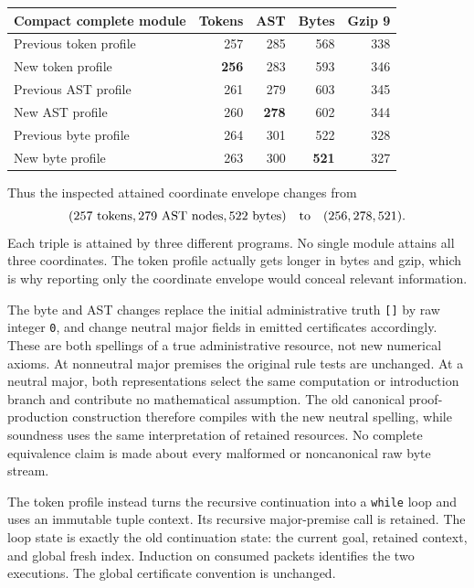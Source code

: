 \documentclass[11pt,a4paper]{article}
\theoremstyle{definition}
\begin{document}
\begin{center}
\small
\begin{tabular}{@{}lrrrr@{}}
\toprule
Compact complete module & Tokens & AST & Bytes & Gzip 9 \\
\midrule
Previous token profile & 257 & 285 & 568 & 338 \\
New token profile & \textbf{256} & 283 & 593 & 346 \\
Previous AST profile & 261 & 279 & 603 & 345 \\
New AST profile & 260 & \textbf{278} & 602 & 344 \\
Previous byte profile & 264 & 301 & 522 & 328 \\
New byte profile & 263 & 300 & \textbf{521} & 327 \\
\bottomrule
\end{tabular}
\end{center}

Thus the inspected attained coordinate envelope changes from
\[
 (257\text{ tokens},279\text{ AST nodes},522\text{ bytes})
 \quad\hbox{to}\quad
 (256,278,521).
\]
Each triple is attained by three different programs. No single module
attains all three coordinates. The token profile actually gets longer
in bytes and gzip, which is why reporting only the coordinate envelope
would conceal relevant information.

The byte and AST changes replace the initial administrative truth
\texttt{[]} by raw integer \texttt{0}, and change neutral major fields
in emitted certificates accordingly. These are both spellings of a
true administrative resource, not new numerical axioms. At nonneutral
major premises the original rule tests are unchanged. At a neutral
major, both representations select the same computation or introduction
branch and contribute no mathematical assumption. The old canonical
proof-production construction therefore compiles with the new neutral
spelling, while soundness uses the same interpretation of retained
resources. No complete equivalence claim is made about every malformed
or noncanonical raw byte stream.

The token profile instead turns the recursive continuation into a
\texttt{while} loop and uses an immutable tuple context. Its recursive
major-premise call is retained. The loop state is exactly the old
continuation state: the current goal, retained context, and global fresh
index. Induction on consumed packets identifies the two executions.
The global certificate convention is unchanged.
\end{document}
